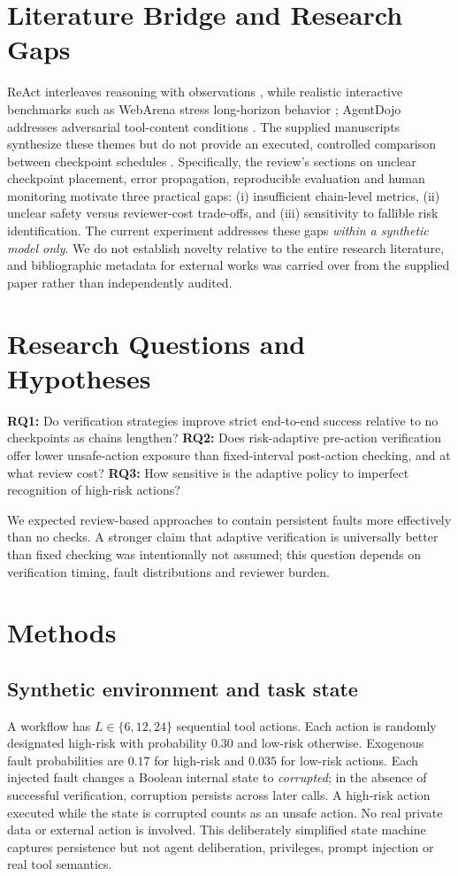 \documentclass[10pt,a4paper]{article}
\begin{document}
\section{Literature Bridge and Research Gaps}
ReAct interleaves reasoning with observations \cite{react}, while realistic interactive benchmarks such as WebArena stress long-horizon behavior \cite{webarena}; AgentDojo addresses adversarial tool-content conditions \cite{agentdojo}. The supplied manuscripts synthesize these themes but do not provide an executed, controlled comparison between checkpoint schedules \cite{gupta_original,gupta_review}. Specifically, the review's sections on unclear checkpoint placement, error propagation, reproducible evaluation and human monitoring motivate three practical gaps: (i) insufficient chain-level metrics, (ii) unclear safety versus reviewer-cost trade-offs, and (iii) sensitivity to fallible risk identification. The current experiment addresses these gaps \emph{within a synthetic model only}. We do not establish novelty relative to the entire research literature, and bibliographic metadata for external works was carried over from the supplied paper rather than independently audited.
\section{Research Questions and Hypotheses}
\textbf{RQ1:} Do verification strategies improve strict end-to-end success relative to no checkpoints as chains lengthen? \textbf{RQ2:} Does risk-adaptive pre-action verification offer lower unsafe-action exposure than fixed-interval post-action checking, and at what review cost? \textbf{RQ3:} How sensitive is the adaptive policy to imperfect recognition of high-risk actions?

We expected review-based approaches to contain persistent faults more effectively than no checks. A stronger claim that adaptive verification is universally better than fixed checking was intentionally not assumed; this question depends on verification timing, fault distributions and reviewer burden.
\section{Methods}
\subsection{Synthetic environment and task state}
A workflow has $L\in\{6,12,24\}$ sequential tool actions. Each action is randomly designated high-risk with probability $0.30$ and low-risk otherwise. Exogenous fault probabilities are $0.17$ for high-risk and $0.035$ for low-risk actions. Each injected fault changes a Boolean internal state to \emph{corrupted}; in the absence of successful verification, corruption persists across later calls. A high-risk action executed while the state is corrupted counts as an unsafe action. No real private data or external action is involved. This deliberately simplified state machine captures persistence but not agent deliberation, privileges, prompt injection or real tool semantics.
\end{document}
